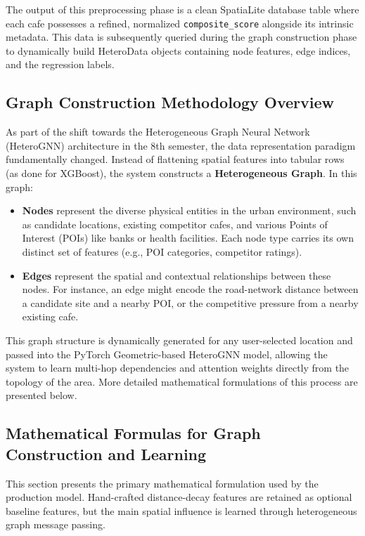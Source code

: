The output of this preprocessing phase is a clean SpatiaLite database table where each cafe possesses a refined, normalized \texttt{composite\_score} alongside its intrinsic metadata. This data is subsequently queried during the graph construction phase to dynamically build HeteroData objects containing node features, edge indices, and the regression labels.

\subsection{Graph Construction Methodology Overview}
As part of the shift towards the Heterogeneous Graph Neural Network (HeteroGNN) architecture in the 8th semester, the data representation paradigm fundamentally changed. Instead of flattening spatial features into tabular rows (as done for XGBoost), the system constructs a \textbf{Heterogeneous Graph}. In this graph:
\begin{itemize}
    \item \textbf{Nodes} represent the diverse physical entities in the urban environment, such as candidate locations, existing competitor cafes, and various Points of Interest (POIs) like banks or health facilities. Each node type carries its own distinct set of features (e.g., POI categories, competitor ratings).
    \item \textbf{Edges} represent the spatial and contextual relationships between these nodes. For instance, an edge might encode the road-network distance between a candidate site and a nearby POI, or the competitive pressure from a nearby existing cafe.
\end{itemize}
This graph structure is dynamically generated for any user-selected location and passed into the PyTorch Geometric-based HeteroGNN model, allowing the system to learn multi-hop dependencies and attention weights directly from the topology of the area. More detailed mathematical formulations of this process are presented below.

\subsection{Mathematical Formulas for Graph Construction and Learning}

This section presents the primary mathematical formulation used by the production model. Hand-crafted distance-decay features are retained as optional baseline features, but the main spatial influence is learned through heterogeneous graph message passing.


